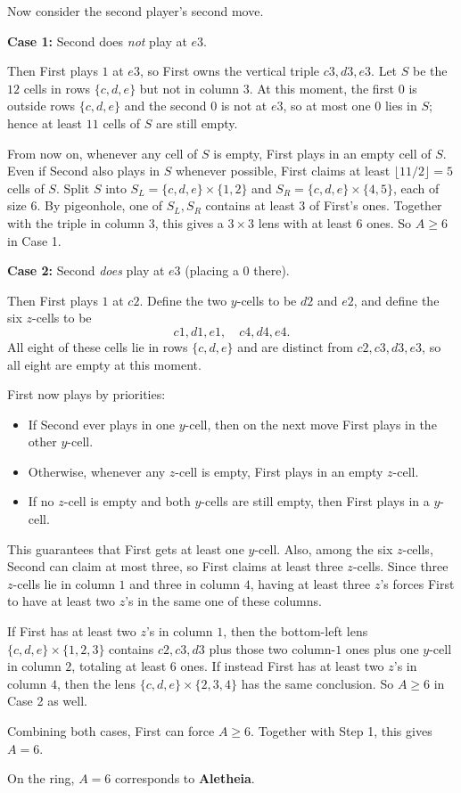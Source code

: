 Now consider the second player's second move.

\medskip
\textbf{Case 1:} Second does \emph{not} play at $e3$.

Then First plays $1$ at $e3$, so First owns the vertical triple $c3,d3,e3$.
Let $S$ be the $12$ cells in rows $\{c,d,e\}$ but not in column $3$.
At this moment, the first $0$ is outside rows $\{c,d,e\}$ and the second $0$ is not at $e3$,
so at most one $0$ lies in $S$; hence at least $11$ cells of $S$ are still empty.

From now on, whenever any cell of $S$ is empty, First plays in an empty cell of $S$.
Even if Second also plays in $S$ whenever possible, First claims at least $\lfloor 11/2\rfloor=5$ cells of $S$.
Split $S$ into $S_L=\{c,d,e\}\times\{1,2\}$ and $S_R=\{c,d,e\}\times\{4,5\}$, each of size $6$.
By pigeonhole, one of $S_L,S_R$ contains at least $3$ of First's ones.
Together with the triple in column $3$, this gives a $3\times3$ lens with at least $6$ ones.
So $A\ge 6$ in Case 1.

\medskip
\textbf{Case 2:} Second \emph{does} play at $e3$ (placing a $0$ there).

Then First plays $1$ at $c2$.
Define the two $y$-cells to be $d2$ and $e2$, and define the six $z$-cells to be
\[
c1,d1,e1,\quad c4,d4,e4.
\]
All eight of these cells lie in rows $\{c,d,e\}$ and are distinct from $c2,c3,d3,e3$,
so all eight are empty at this moment.

First now plays by priorities:
\begin{itemize}
\item If Second ever plays in one $y$-cell, then on the next move First plays in the other $y$-cell.
\item Otherwise, whenever any $z$-cell is empty, First plays in an empty $z$-cell.
\item If no $z$-cell is empty and both $y$-cells are still empty, then First plays in a $y$-cell.
\end{itemize}
This guarantees that First gets at least one $y$-cell.
Also, among the six $z$-cells, Second can claim at most three, so First claims at least three $z$-cells.
Since three $z$-cells lie in column $1$ and three in column $4$, having at least three $z$'s forces
First to have at least two $z$'s in the same one of these columns.

If First has at least two $z$'s in column $1$, then the bottom-left lens $\{c,d,e\}\times\{1,2,3\}$ contains
$c2,c3,d3$ plus those two column-$1$ ones plus one $y$-cell in column $2$, totaling at least $6$ ones.
If instead First has at least two $z$'s in column $4$, then the lens $\{c,d,e\}\times\{2,3,4\}$ has the same conclusion.
So $A\ge 6$ in Case 2 as well.

\medskip
Combining both cases, First can force $A\ge 6$.
Together with Step 1, this gives $A=6$.

On the ring, $A=6$ corresponds to \textbf{Aletheia}.


\NextPage
